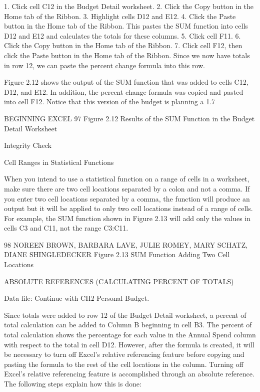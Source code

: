 1. Click cell C12 in the Budget Detail worksheet.
2. Click the Copy button in the Home tab of the Ribbon.
3. Highlight cells D12 and E12.
4. Click the Paste button in the Home tab of the Ribbon. This pastes the SUM function into cells
D12 and E12 and calculates the totals for these columns.
5. Click cell F11.
6. Click the Copy button in the Home tab of the Ribbon.
7. Click cell F12, then click the Paste button in the Home tab of the Ribbon. Since we now have
totals in row 12, we can paste the percent change formula into this row.

Figure 2.12 shows the output of the SUM function that was added to cells C12, D12, and E12. In
addition, the percent change formula was copied and pasted into cell F12. Notice that this version of
the budget is planning a 1.7%




BEGINNING EXCEL 97
Figure 2.12 Results of the SUM Function in the Budget Detail Worksheet




Integrity Check

Cell Ranges in Statistical Functions

When you intend to use a statistical function on a range of cells in a worksheet, make sure there are two cell
locations separated by a colon and not a comma. If you enter two cell locations separated by a comma, the function
will produce an output but it will be applied to only two cell locations instead of a range of cells. For example, the
SUM function shown in Figure 2.13 will add only the values in cells C3 and C11, not the range C3:C11.




98 NOREEN BROWN, BARBARA LAVE, JULIE ROMEY, MARY SCHATZ, DIANE SHINGLEDECKER
Figure 2.13 SUM Function Adding Two Cell Locations


ABSOLUTE REFERENCES (CALCULATING PERCENT OF TOTALS)

Data file: Continue with CH2 Personal Budget.

Since totals were added to row 12 of the Budget Detail worksheet, a percent of total calculation can
be added to Column B beginning in cell B3. The percent of total calculation shows the percentage
for each value in the Annual Spend column with respect to the total in cell D12. However, after the
formula is created, it will be necessary to turn off Excel’s relative referencing feature before copying
and pasting the formula to the rest of the cell locations in the column. Turning off Excel’s relative
referencing feature is accomplished through an absolute reference. The following steps explain how
this is done:

